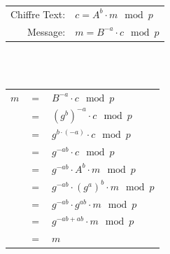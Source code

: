 \documentclass[
  a4paper,
  11pt,
]{article}
\begin{document}
\begin{center}

\begin{tabular}{rl}
	Chiffre Text:	&	$c=A^b\cdot m\mod p$\\
	Message:		&	$m=B^{-a}\cdot c\mod p$\\
\end{tabular}

\ \\ \ \\

\begin{tabular}{rcl}
	$m$		&	$=$ &	$B^{-a}\cdot c\mod p$\\
			&	$=$	&	$(g^b)^{-a}\cdot c\mod p$\\
			&	$=$	&	$g^{b\cdot (-a)}\cdot c\mod p$\\			
			&	$=$	&	$g^{-ab}\cdot c\mod p$\\
			&	$=$	&	$g^{-ab}\cdot A^b\cdot m\mod p$\\
			&	$=$	&	$g^{-ab}\cdot (g^a)^b\cdot m\mod p$\\
			&	$=$	&	$g^{-ab}\cdot g^{ab}\cdot m\mod p$\\
			&	$=$	&	$g^{-ab+ab}\cdot m\mod p$\\
			&	$=$	&	$m$\\
\end{tabular}
\end{center}
\end{document}
